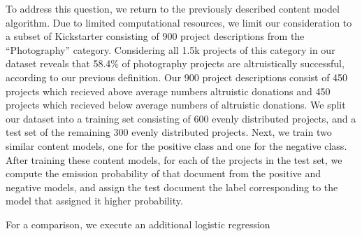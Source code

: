 \documentclass[letterpaper]{article}
\begin{document}
To address this question, we return to the previously described content model algorithm. Due to limited computational resources, we limit our consideration to a subset of Kickstarter consisting of 900 project descriptions from the ``Photography'' category. Considering all 1.5k projects of this category in our dataset reveals that 58.4\% of photography projects are altruistically successful, according to our previous definition. Our 900 project descriptions consist of 450 projects which recieved above average numbers altruistic donations and 450 projects which recieved below average numbers of altruistic donations. We split our dataset into a training set consisting of 600 evenly distributed projects, and a test set of the remaining 300 evenly distributed projects. Next, we train two similar content models, one for the positive class and one for the negative class. After training these content models, for each of the projects in the test set, we compute the emission probability of that document from the positive and negative models, and assign the test document the label corresponding to the model that assigned it higher probability.

For a comparison, we execute an additional logistic regression
\end{document}

